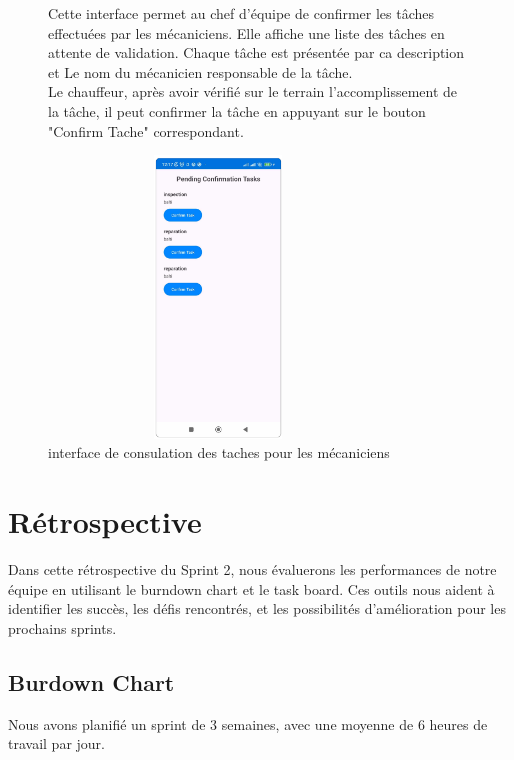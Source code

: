 \begin{figure}[htbp]
  \centering
  \begin{minipage}{0.58\textwidth}
    \raggedright
    Cette interface permet au chef d'équipe de confirmer les tâches effectuées par les mécaniciens. Elle affiche une liste des tâches en attente de validation. Chaque tâche est présentée  par ca description et Le nom du mécanicien responsable de la tâche.\\

    Le chauffeur, après avoir vérifié sur le terrain l'accomplissement de la tâche, il peut confirmer la tâche en appuyant sur le bouton "Confirm Tache" correspondant.
  \end{minipage}
  \hfill
  \begin{minipage}{0.39\textwidth}
    \centering
    \includegraphics[width=0.8\textwidth,height=7.5cm]{chap4.images/valider taches.png}
    \caption{interface de consulation des taches pour les mécaniciens }
  \end{minipage}
\end{figure}



\newpage
\section{Rétrospective}
Dans cette rétrospective du Sprint 2, nous évaluerons les performances de notre équipe en utilisant le burndown chart et le task board. Ces outils nous aident à identifier les succès, les défis rencontrés, et les possibilités d'amélioration pour les prochains sprints.

\subsection{Burdown Chart}
Nous avons planifié un sprint de 3 semaines, avec une moyenne de 6 heures de travail par jour.


